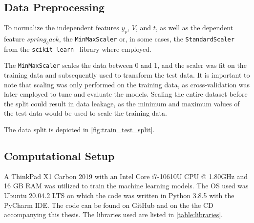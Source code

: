 \subsection{Data Preprocessing}\label{subsec:data-preprocessing}
To normalize the independent features $y_p$, $V$, and $t$, as well as the dependent feature $spring_back$, the
\texttt{MinMaxScaler} or, in some cases, the \texttt{StandardScaler} from the
\texttt{scikit-learn}~\cite{scikit -learn} library where employed.

The \texttt{MinMaxScaler} scales the data between 0 and 1, and the scaler was fit on the training data and
subsequently used to transform the test data.
It is important to note that scaling was only performed on the training data, as cross-validation was later employed
to tune and evaluate the models.
Scaling the entire dataset before the split could result in data leakage, as the minimum and maximum values of the
test data would be used to scale the training data.

The data split is depicted in \cref{fig:train_test_split}.

\subsection{Computational Setup}\label{subsec:computational-setup}
A ThinkPad X1 Carbon 2019 with an Intel Core i7-10610U CPU @ 1.80GHz and 16 GB RAM was utilized to train the machine
learning models.
The OS used was Ubuntu 20.04.2 LTS on which the code was written in Python 3.8.5 with the PyCharm IDE.
The code can be found on GitHub and on the the CD accompanying this thesis.
The libraries used are listed in \cref{table:libraries}.

